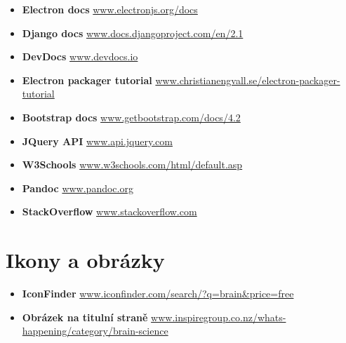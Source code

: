 \begin{itemize}
\tightlist
\item
  \textbf{Electron docs}
  \href{https://electronjs.org/docs}{www.electronjs.org/docs}
\item
  \textbf{Django docs}
  \href{https://docs.djangoproject.com/en/2.1/}{www.docs.djangoproject.com/en/2.1}
\item
  \textbf{DevDocs} \href{https://devdocs.io/}{www.devdocs.io}
\item
  \textbf{Electron packager tutorial}
  \href{https://www.christianengvall.se/electron-packager-tutorial/}{www.christianengvall.se/electron-packager-tutorial}
\item
  \textbf{Bootstrap docs}
  \href{https://getbootstrap.com/docs/4.2/getting-started/introduction/}{www.getbootstrap.com/docs/4.2}
\item
  \textbf{JQuery API} \href{https://api.jquery.com/}{www.api.jquery.com}
\item
  \textbf{W3Schools}
  \href{https://www.w3schools.com/html/default.asp}{www.w3schools.com/html/default.asp}
\item
  \textbf{Pandoc} \href{https://pandoc.org/}{www.pandoc.org}
\item
  \textbf{StackOverflow}
  \href{https://stackoverflow.com/}{www.stackoverflow.com}
\end{itemize}

\hypertarget{ikony-a-obruxe1zky}{%
\section*{Ikony a obrázky}\label{ikony-a-obruxe1zky}}

\begin{itemize}
\tightlist
\item
  \textbf{IconFinder}
  \href{https://www.iconfinder.com/search/?q=brain\&price=free}{www.iconfinder.com/search/?q=brain\&price=free}
\item
  \textbf{Obrázek na titulní straně}
  \href{http://www.inspiregroup.co.nz/whats-happening/category/brain-science/}{www.inspiregroup.co.nz/whats-happening/category/brain-science}
\end{itemize}